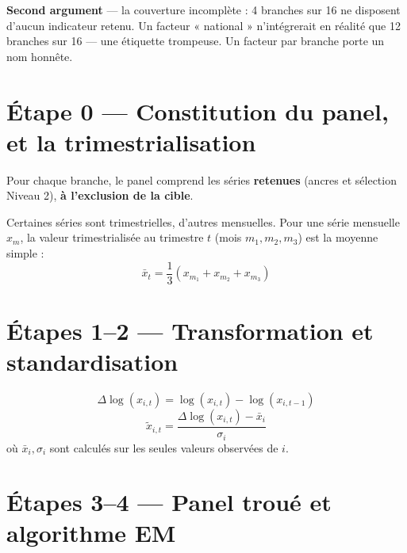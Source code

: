 \documentclass[11pt,a4paper]{article}
\begin{document}
\textbf{Second argument} --- la couverture incomplète : 4 branches sur 16 ne disposent d'aucun indicateur retenu. Un facteur « national » n'intégrerait en réalité que 12 branches sur 16 --- une étiquette trompeuse. Un facteur par branche porte un nom honnête.

\section{Étape 0 --- Constitution du panel, et la trimestrialisation}
\label{sec:trimestrialisation}

Pour chaque branche, le panel comprend les séries \textbf{retenues} (ancres et sélection Niveau 2), \textbf{à l'exclusion de la cible}.

\begin{definitionbox}
Certaines séries sont trimestrielles, d'autres mensuelles. Pour une série mensuelle $x_m$, la valeur trimestrialisée au trimestre $t$ (mois $m_1,m_2,m_3$) est la moyenne simple :
\begin{equation}
\bar{x}_t = \frac{1}{3}\left(x_{m_1} + x_{m_2} + x_{m_3}\right)
\label{eq:trimestrialisation}
\end{equation}
\end{definitionbox}

\section{Étapes 1--2 --- Transformation et standardisation}

\begin{equation}
\Delta\log(x_{i,t}) = \log(x_{i,t}) - \log(x_{i,t-1})
\label{eq:deltalog}
\end{equation}
\begin{equation}
\tilde{x}_{i,t} = \frac{\Delta\log(x_{i,t}) - \bar{x}_i}{\sigma_i}
\label{eq:standardisation}
\end{equation}
où $\bar{x}_i,\sigma_i$ sont calculés sur les seules valeurs observées de $i$.

\section{Étapes 3--4 --- Panel troué et algorithme EM}
\end{document}
